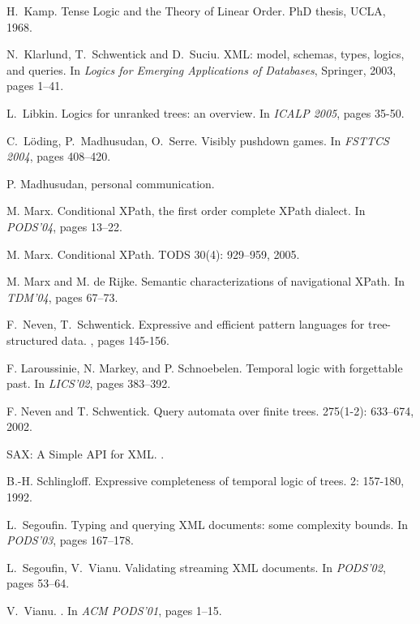 \documentclass{LMCS}
\theoremstyle{plain}
\theoremstyle{definition}
\begin{document}
\begin{thebibliography}{99}
H.~Kamp.
\newblock Tense Logic and the Theory of Linear Order.
\newblock   PhD thesis, UCLA, 1968.

N.~Klarlund, T.~Schwentick and D.~Suciu.
\newblock XML: model, schemas, types, logics, and queries.
\newblock In {\em Logics for Emerging Applications of Databases},
Springer, 2003, pages 1--41.






L.~Libkin.
\newblock Logics for unranked trees: an overview.
\newblock In {\em ICALP 2005}, pages 35-50. 

C.~L\"oding, P.~Madhusudan, O.~Serre.
\newblock Visibly pushdown games. 
\newblock In {\em FSTTCS 2004}, pages 408--420. 



 P. Madhusudan, personal communication.

M. Marx.
\newblock Conditional XPath, the first order complete XPath dialect.
\newblock In {\em PODS'04}, pages 13--22.

M. Marx.
\newblock Conditional XPath. 
\newblock TODS 30(4): 929--959, 2005.

M. Marx and M. de Rijke. 
\newblock 
Semantic characterizations of navigational XPath.
\newblock  In {\em TDM'04}, pages 67--73. 


F.~Neven, T.~Schwentick.
\newblock Expressive and efficient pattern languages for
tree-structured data. 
, pages 145-156. 


F. Laroussinie, N. Markey, and P. Schnoebelen. 
\newblock Temporal logic with forgettable past. 
\newblock In {\em LICS'02}, pages 383--392. 

F. Neven and T. Schwentick.
\newblock Query automata over finite trees. 
 275(1-2): 633--674, 2002.

SAX: A Simple API for XML.
. 

B.-H. Schlingloff. 
\newblock Expressive completeness of temporal logic of trees. 
 2: 157-180, 1992.

L.~Segoufin.
\newblock  Typing and querying XML documents: some complexity bounds. 
\newblock In {\em PODS'03}, pages 167--178. 

L.~Segoufin, V.~Vianu.
\newblock Validating streaming XML documents. 
\newblock In {\em PODS'02},
pages 53--64. 

V.~Vianu.
.
\newblock In {\em ACM PODS'01}, 
pages 1--15.
\end{thebibliography}
\end{document}

